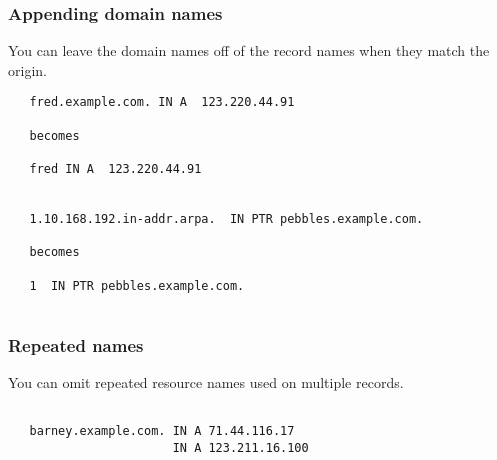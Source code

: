 \documentclass[10pt]{beamer}
\begin{document}
\begin{frame}[fragile]
  \frametitle{Appending domain names}

 You can leave the domain names off of the record names when they match the origin.

 \begin{verbatim}
   fred.example.com. IN A  123.220.44.91

   becomes

   fred IN A  123.220.44.91


   1.10.168.192.in-addr.arpa.  IN PTR pebbles.example.com.

   becomes

   1  IN PTR pebbles.example.com.
   
 \end{verbatim}

\end{frame}



\begin{frame}[fragile]
  \frametitle{Repeated names}

 You can omit repeated resource names used on multiple records.
 \begin{verbatim}
   
   barney.example.com. IN A 71.44.116.17
                       IN A 123.211.16.100
 
\end{verbatim}

\end{frame}
\end{document}
